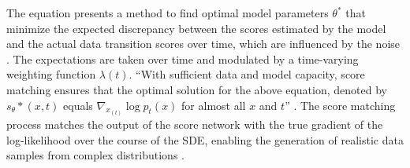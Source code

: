 \citep{song2020score} The equation presents a method to find optimal model parameters \( \theta^* \) that minimize the expected discrepancy between the scores estimated by the model and the actual data transition scores over time, which are influenced by the noise \citep{song2020score}. The expectations are taken over time and modulated by a time-varying weighting function \( \lambda(t) \). ``With sufficient data and model capacity, score matching ensures that the optimal solution for the above equation, denoted by \(s_\theta*(x, t)\) equals \(\nabla_{x_(t)} \log p_{t}(x)\) for almost all \( x \) and \( t \)'' \citep{song2020score}. The score matching process matches the output of the score network with the true gradient of the log-likelihood over the course of the SDE, enabling the generation of realistic data samples from complex distributions \citep{yangdiffusionSummary}.


